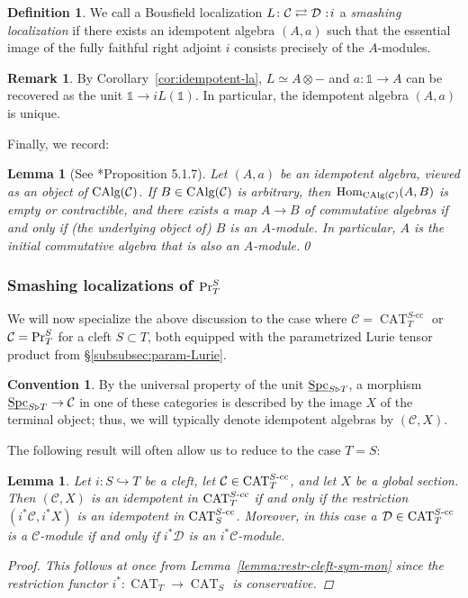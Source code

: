 \documentclass[reqno]{memo-l}
\theoremstyle{mythm}
\newtheorem{lemma}[thm]{Lemma}
\theoremstyle{definition}
\newtheorem{rk}[thm]{Remark}
\newtheorem{convention}[thm]{Convention}
\newtheorem{definition}[thm]{Definition}
\numberwithin{equation}{section}
\newcommand{\Cc}{{\mathcal{C}}}
\newcommand{\Dd}{{\mathcal{D}}}
\newcommand{\bbone}{{\mathds{1}}}
\DeclareMathOperator{\Spc}{Spc}
\DeclareMathOperator{\CAT}{CAT}
\renewcommand{\hom}{\textup{hom}}
\renewcommand{\hom}{{\textup{Hom}}}
\DeclareMathOperator{\CAlg}{\textup{CAlg}}
\renewcommand{\Pr}{\textup{Pr}}
\newcommand{\ulhelper}[2]{\underline{\setbox0=\hbox{$#1#2$}\dp0=0.4pt \box0\relax}}
\newcommand{\ul}[1]{{\mathpalette\ulhelper{#1}}\hbox{\rule[-2pt]{0pt}{0pt}}}
\newcommand\noloc{%
	\nobreak
	\mspace{6mu plus 1mu}
	{:}
	\nonscript\mkern-\thinmuskip
	\mathpunct{}
	\mspace{2mu}
}
\begin{document}
\begin{definition}
    We call a Bousfield localization $L\colon\Cc\rightleftarrows\Dd\noloc i$ a \emph{smashing localization} if there exists an idempotent algebra $(A,a)$ such that the essential image of the fully faithful right adjoint $i$ consists precisely of the $A$-modules.
\end{definition}

\begin{rk}
    By Corollary~\ref{cor:idempotent-la}, $L\simeq A\otimes{-}$ and $a\colon\bbone\to A$ can be recovered as the unit $\bbone\to iL(\bbone)$. In particular, the idempotent algebra $(A,a)$ is unique.
\end{rk}

Finally, we record:

\begin{lemma}[See \cite{CSY2021AmbiHeight}*{Proposition 5.1.7}]\label{lemma:unique-algebra-structure-initial}
    Let $(A,a)$ be an idempotent algebra, viewed as an object of $\CAlg(\Cc)$. If $B\in\CAlg(\Cc)$ is arbitrary, then $\hom_{\CAlg(\Cc)}(A,B)$ is empty or contractible, and there exists a map $A\to B$ of commutative algebras if and only if (the underlying object of) $B$ is an $A$-module. In particular, $A$ is the initial commutative algebra that is also an $A$-module.\qed
\end{lemma}

\subsubsection{Smashing localizations of $\Pr^S_T$}
We will now specialize the above discussion to the case where $\Cc=\CAT_T^\text{$S$-cc}$ or $\Cc=\Pr^S_T$ for a cleft $S\subset T$, both equipped with the parametrized Lurie tensor product from §\ref{subsubsec:param-Lurie}.

\begin{convention}
    By the universal property of the unit $\ul\Spc_{S\triangleright T}$, a morphism $\ul\Spc_{S\triangleright T}\to \Cc$ in one of these categories is described by the image $X$ of the terminal object; thus, we will typically denote idempotent algebras by $(\Cc,X)$. 
\end{convention}

The following result will often allow us to reduce to the case $T=S$:

\begin{lemma}\label{lemma:idempotent-restrict}
    Let $i\colon S\hookrightarrow T$ be a cleft, let $\Cc\in\CAT_T^\textup{$S$-cc}$, and let $X$ be a global section. Then $(\Cc,X)$ is an idempotent in $\CAT_T^\textup{$S$-cc}$ if and only if the restriction $(i^*\Cc,i^*X)$ is an idempotent in $\CAT^\textup{$S$-cc}_S$. Moreover, in this case a $\Dd\in\CAT_T^\textup{$S$-cc}$ is a $\Cc$-module if and only if $i^*\Dd$ is an $i^*\Cc$-module.
    \begin{proof}
        This follows at once from Lemma~\ref{lemma:restr-cleft-sym-mon} since the restriction functor $i^*\colon\CAT_T\to\CAT_S$ is conservative.
    \end{proof}
\end{lemma}
\end{document}
